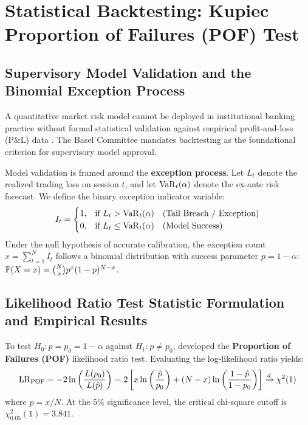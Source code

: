
\section{Statistical Backtesting: Kupiec Proportion of Failures (POF) Test}
\label{sec:kupiec_backtesting}

\subsection{Supervisory Model Validation and the Binomial Exception Process}

A quantitative market risk model cannot be deployed in institutional banking practice without formal statistical validation against empirical profit-and-loss (P\&L) data \citep{kupiec1995techniques}. The Basel Committee mandates backtesting as the foundational criterion for supervisory model approval.

Model validation is framed around the \textbf{exception process}. Let $L_t$ denote the realized trading loss on session $t$, and let $\operatorname{VaR}_t(\alpha)$ denote the ex-ante risk forecast. We define the binary exception indicator variable:
\begin{equation}
    I_t = \begin{cases} 1, & \text{if } L_t > \operatorname{VaR}_t(\alpha) \quad \text{(Tail Breach / Exception)} \\ 0, & \text{if } L_t \le \operatorname{VaR}_t(\alpha) \quad \text{(Model Success)} \end{cases}
    \label{eq:indicator_breach}
\end{equation}
Under the null hypothesis of accurate calibration, the exception count $x = \sum_{t=1}^N I_t$ follows a binomial distribution with success parameter $p = 1 - \alpha$: $\mathbb{P}(X = x) = \binom{N}{x} p^x (1-p)^{N-x}$.

\subsection{Likelihood Ratio Test Statistic Formulation and Empirical Results}

To test $H_0: p = p_0 = 1 - \alpha$ against $H_1: p \ne p_0$, \citet{kupiec1995techniques} developed the \textbf{Proportion of Failures (POF)} likelihood ratio test. Evaluating the log-likelihood ratio yields:
\begin{equation}
    \operatorname{LR}_{\operatorname{POF}} = -2 \ln \left( \frac{L(p_0)}{L(\hat{p})} \right) = 2 \left[ x \ln \left( \frac{\hat{p}}{p_0} \right) + (N - x) \ln \left( \frac{1 - \hat{p}}{1 - p_0} \right) \right] \xrightarrow{d} \chi^2(1)
    \label{eq:lr_pof_formula}
\end{equation}
where $\hat{p} = x / N$. At the $5\%$ significance level, the critical chi-square cutoff is $\chi^2_{0.05}(1) = 3.841$.


